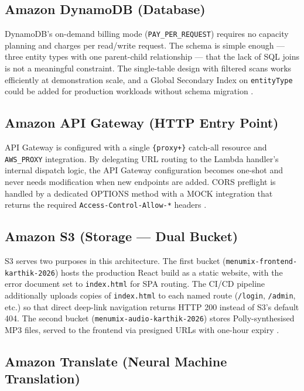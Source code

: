 \documentclass[conference]{IEEEtran}
\begin{document}
\subsection{Amazon DynamoDB (Database)}

DynamoDB's on-demand billing mode (\texttt{PAY\_PER\_REQUEST}) requires no capacity planning and charges per read/write request. The schema is simple enough --- three entity types with one parent-child relationship --- that the lack of SQL joins is not a meaningful constraint. The single-table design with filtered scans works efficiently at demonstration scale, and a Global Secondary Index on \texttt{entityType} could be added for production workloads without schema migration \cite{dynamodocs}.

\subsection{Amazon API Gateway (HTTP Entry Point)}

API Gateway is configured with a single \texttt{\{proxy+\}} catch-all resource and \texttt{AWS\_PROXY} integration. By delegating URL routing to the Lambda handler's internal dispatch logic, the API Gateway configuration becomes one-shot and never needs modification when new endpoints are added. CORS preflight is handled by a dedicated OPTIONS method with a MOCK integration that returns the required \texttt{Access-Control-Allow-*} headers \cite{apigwdocs}.

\subsection{Amazon S3 (Storage --- Dual Bucket)}

S3 serves two purposes in this architecture. The first bucket (\texttt{menumix-frontend-karthik-2026}) hosts the production React build as a static website, with the error document set to \texttt{index.html} for SPA routing. The CI/CD pipeline additionally uploads copies of \texttt{index.html} to each named route (\texttt{/login}, \texttt{/admin}, etc.) so that direct deep-link navigation returns HTTP 200 instead of S3's default 404. The second bucket (\texttt{menumix-audio-karthik-2026}) stores Polly-synthesised MP3 files, served to the frontend via presigned URLs with one-hour expiry \cite{s3docs}.

\subsection{Amazon Translate (Neural Machine Translation)}
\end{document}
